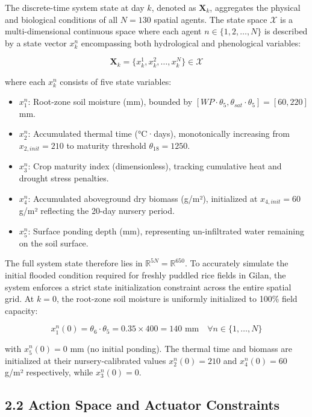 The discrete-time system state at day \(k\), denoted as
\(\mathbf{X}_k\), aggregates the physical and biological conditions of
all \(N = 130\) spatial agents. The state space \(\mathcal{X}\) is a
multi-dimensional continuous space where each agent
\(n \in \{1, 2, \ldots, N\}\) is described by a state vector \(x_k^n\)
encompassing both hydrological and phenological variables:

\[\mathbf{X}_k = \{x_k^1, x_k^2, \ldots, x_k^N\} \in \mathcal{X} \tag{1}\]

where each \(x_k^n\) consists of five state variables:

\begin{itemize}
\tightlist
\item
  \(x_1^n\): Root-zone soil moisture (mm), bounded by
  \([WP \cdot \theta_5, \theta_{sat} \cdot \theta_5] = [60, 220]\) mm.
\item
  \(x_2^n\): Accumulated thermal time (°C·days), monotonically
  increasing from \(x_{2,init} = 210\) to maturity threshold
  \(\theta_{18} = 1250\).
\item
  \(x_3^n\): Crop maturity index (dimensionless), tracking cumulative
  heat and drought stress penalties.
\item
  \(x_4^n\): Accumulated aboveground dry biomass (g/m²), initialized at
  \(x_{4,init} = 60\) g/m² reflecting the 20-day nursery period.
\item
  \(x_5^n\): Surface ponding depth (mm), representing un-infiltrated
  water remaining on the soil surface.
\end{itemize}

The full system state therefore lies in
\(\mathbb{R}^{5N} = \mathbb{R}^{650}\). To accurately simulate the
initial flooded condition required for freshly puddled rice fields in
Gilan, the system enforces a strict state initialization constraint
across the entire spatial grid. At \(k = 0\), the root-zone soil
moisture is uniformly initialized to 100\% field capacity:

\[x_1^n(0) = \theta_6 \cdot \theta_5 = 0.35 \times 400 = 140 \text{ mm} \quad \forall n \in \{1, \ldots, N\} \tag{2}\]

with \(x_5^n(0) = 0\) mm (no initial ponding). The thermal time and
biomass are initialized at their nursery-calibrated values
\(x_2^n(0) = 210\) and \(x_4^n(0) = 60\) g/m² respectively, while
\(x_3^n(0) = 0\).

\subsection{2.2 Action Space and Actuator
Constraints}\label{action-space-and-actuator-constraints}

